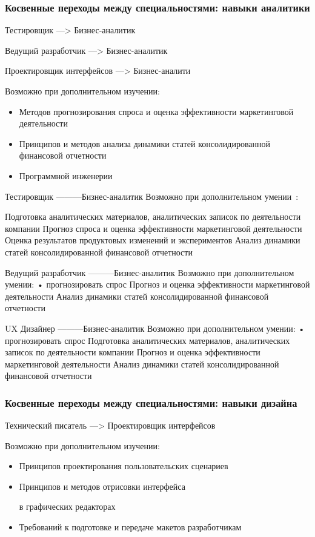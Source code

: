 \documentclass{../industrial-development}
\begin{document}
\begin{frame} \frametitle{Косвенные переходы между специальностями: навыки аналитики }

\begin{block}{Тестировщик ---> Бизнес-аналитик  

Ведущий разработчик ---> Бизнес-аналитик  

Проектировщик интерфейсов ---> Бизнес-аналити}

Возможно при дополнительном изучении:
  \end{block}
\begin{itemize}
  \item Методов прогнозирования спроса и оценка эффективности маркетинговой деятельности
\item Принципов и методов анализа динамики статей консолидированной финансовой отчетности
 \item Программной инженерии
  \end{itemize}
\end{frame}

\lecturenotes


Тестировщик ---------Бизнес-аналитик
Возможно при дополнительном умении~\cite{rab}:

 Подготовка аналитических материалов, аналитических записок по деятельности компании
Прогноз спроса и оценка эффективности маркетинговой деятельности
 Оценка результатов продуктовых изменений и экспериментов
Анализ динамики статей консолидированной финансовой отчетности

Ведущий разработчик ---------Бизнес-аналитик
Возможно при дополнительном умении:
•	прогнозировать спрос 
 Прогноз и оценка эффективности маркетинговой деятельности
 Анализ динамики статей консолидированной финансовой отчетности

UX Дизайнер ---------Бизнес-аналитик
Возможно при дополнительном умении:
•	прогнозировать спрос 
Подготовка аналитических материалов, аналитических записок по деятельности компании
 Прогноз и оценка эффективности маркетинговой деятельности
 Анализ динамики статей консолидированной финансовой отчетности





\begin{frame} \frametitle{Косвенные переходы между специальностями: навыки дизайна }

\begin{block}{Технический писатель ---> Проектировщик интерфейсов}

Возможно при дополнительном изучении:
  \end{block}
\begin{itemize}
  \item Принципов проектирования пользовательских сценариев
  \item Принципов и методов отрисовки интерфейса 

в графических редакторах
\item Требований к подготовке и передаче макетов разработчикам
  \end{itemize}
\end{frame}
\end{document}
